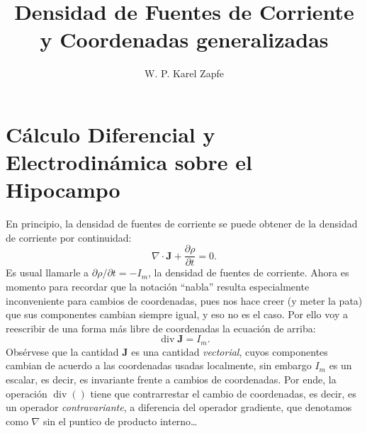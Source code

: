 \documentclass{article}
\title{Densidad de Fuentes de Corriente y Coordenadas generalizadas}
\author{W. P. Karel Zapfe}
\newcommand{\Jd}{\mathbf{J}}
\DeclareMathOperator{\diver}{div}
\begin{document}
\maketitle

\section{Cálculo Diferencial y Electrodinámica sobre el Hipocampo}

En principio, la densidad de fuentes de corriente se puede obtener
de la densidad de corriente por continuidad:
\begin{equation}
\nabla \cdot \Jd +\frac{\partial \rho}{\partial t}=0.
\end{equation}
Es usual llamarle a $\partial \rho /\partial t =-I_m$, la densidad de 
fuentes de corriente.
Ahora es momento para recordar que la notación ``nabla'' resulta especialmente
inconveniente para cambios de coordenadas, pues nos hace creer (y meter la pata)
que sus componentes cambian siempre igual, y eso no es el caso. Por
ello voy a reescribir de una forma más libre de coordenadas la ecuación de arriba:
\begin{equation}
\diver \Jd =I_m.
\end{equation}
Obsérvese que la cantidad $\Jd$ es una cantidad \emph{vectorial}, cuyos componentes
cambian de acuerdo a las coordenadas usadas localmente, sin embargo $I_m$ es un
escalar, es decir, es invariante frente a cambios de coordenadas. Por
ende, la operación $\diver ()$ tiene que contrarrestar el cambio de coordenadas,
es decir, es un operador \emph{contravariante}, a diferencia del operador
gradiente, que denotamos como $\nabla$ sin el puntico de producto interno\ldots
\end{document}
